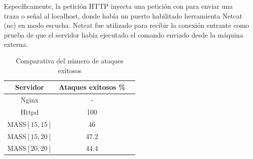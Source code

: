 Específicamente, la petición HTTP inyecta una petición con \cite{netcat} para enviar una traza o señal al localhost, donde había un puerto habilitado herramienta Netcat (nc) en modo escucha. Netcat fue utilizado para recibir la conexión entrante como prueba de que el servidor había ejecutado el comando enviado desde la máquina externa.

\begin{table}[H]
    \centering
    \begin{tabular}{|c|c|c|}
        \hline
        \textbf{Servidor} & \textbf{Ataques exitosos \%} \\ 
        \hline
        Nginx & - \\ 
        Httpd & 100 \\ 
        MASS$[15,15]$ & 46 \\ 
        MASS$[15,20]$ & 47.2 \\ 
        MASS$[20,20]$ & 44.4 \\ 
        \hline
    \end{tabular}
    \caption{Comparativa del número de ataques exitosos}
    \end{table}
